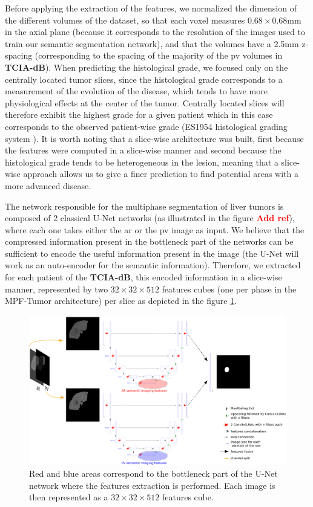\documentclass[]{article}
\newcommand{\pplfont}[1]{{\fontfamily{ppl}\selectfont #1}}
\newcommand{\lmttfont}[1]{{\fontfamily{lmtt}\selectfont #1}}
\newcommand{\todo}[1]{{\textcolor{red}{\textbf{#1}}}}
\begin{document}
Before applying the extraction of the features, we normalized
the dimension of the different volumes of the dataset, so that each
voxel measures $ 0.68\times0.68 $mm in the axial plane (because it corresponds to
the resolution of the images used to train our semantic segmentation
network), and that the volumes have a 2.5mm z-spacing (corresponding to the
spacing of the majority of the \ac{pv} volumes in \textbf{\lmttfont{TCIA-dB}}).
When predicting the histological grade, we focused only on the centrally located tumor slices, since the histological grade corresponds to a measurement of the evolution of the
disease, which tends to have more physiological effects at the center of
the tumor. Centrally located slices will therefore exhibit the highest
grade for a given patient which in this case
corresponds to the observed patient-wise grade (ES1954 histological grading system \cite{EdmondsonHA1954}). It is worth noting that a slice-wise architecture was built, first because the features were computed in a slice-wise manner and second because the
histological grade tends to be heterogeneous in the lesion, meaning that
a slice-wise approach allows us to give a finer prediction to find
potential areas with a more advanced disease.

The network responsible for the multiphase segmentation of liver tumors is composed of 2 classical U-Net networks (as illustrated in the figure \todo{Add ref}), where each
one takes either the \ac{ar} or the \ac{pv} image as input. We believe
that the compressed information present in the bottleneck part of the
networks can be sufficient to encode the useful information present in the
image (the U-Net will work as an auto-encoder for the semantic information). Therefore, we extracted for each patient of the \textbf{\lmttfont{TCIA-dB}}, this
encoded information in a slice-wise manner, represented by two $ 32\times32\times512 $
features cubes (one per phase in the \pplfont{MPF-Tumor} architecture) per slice
as depicted in the figure \ref{fig:MPF_Features_Selection}.


\begin{figure}[!ht]
	\centering
	\includegraphics[width=0.95\linewidth]{../HistologicalGradePrediction/images/MPF_Features_Selection2}
	\caption{Red and blue areas correspond to the bottleneck part of the U-Net
	network where the features extraction is performed. Each image is then
	represented as a $ 32\times32\times512 $ features cube.}
	\label{fig:MPF_Features_Selection}
\end{figure}
\end{document}
